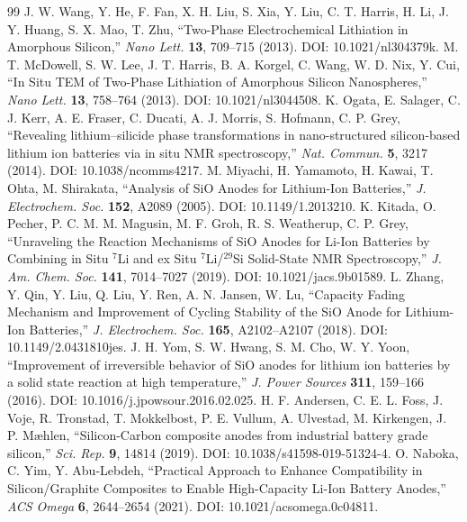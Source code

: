 \begin{thebibliography}{99}
 J. W. Wang, Y. He, F. Fan, X. H. Liu, S. Xia, Y. Liu, C. T. Harris, H. Li, J. Y. Huang, S. X. Mao, T. Zhu, ``Two-Phase Electrochemical Lithiation in Amorphous Silicon,'' \emph{Nano Lett.} \textbf{13}, 709--715 (2013). DOI: 10.1021/nl304379k.
 M. T. McDowell, S. W. Lee, J. T. Harris, B. A. Korgel, C. Wang, W. D. Nix, Y. Cui, ``In Situ TEM of Two-Phase Lithiation of Amorphous Silicon Nanospheres,'' \emph{Nano Lett.} \textbf{13}, 758--764 (2013). DOI: 10.1021/nl3044508.
 K. Ogata, E. Salager, C. J. Kerr, A. E. Fraser, C. Ducati, A. J. Morris, S. Hofmann, C. P. Grey, ``Revealing lithium–silicide phase transformations in nano-structured silicon-based lithium ion batteries via in situ NMR spectroscopy,'' \emph{Nat. Commun.} \textbf{5}, 3217 (2014). DOI: 10.1038/ncomms4217.
 M. Miyachi, H. Yamamoto, H. Kawai, T. Ohta, M. Shirakata, ``Analysis of SiO Anodes for Lithium-Ion Batteries,'' \emph{J. Electrochem. Soc.} \textbf{152}, A2089 (2005). DOI: 10.1149/1.2013210.
 K. Kitada, O. Pecher, P. C. M. M. Magusin, M. F. Groh, R. S. Weatherup, C. P. Grey, ``Unraveling the Reaction Mechanisms of SiO Anodes for Li-Ion Batteries by Combining in Situ $^{7}$Li and ex Situ $^{7}$Li/$^{29}$Si Solid-State NMR Spectroscopy,'' \emph{J. Am. Chem. Soc.} \textbf{141}, 7014--7027 (2019). DOI: 10.1021/jacs.9b01589.
 L. Zhang, Y. Qin, Y. Liu, Q. Liu, Y. Ren, A. N. Jansen, W. Lu, ``Capacity Fading Mechanism and Improvement of Cycling Stability of the SiO Anode for Lithium-Ion Batteries,'' \emph{J. Electrochem. Soc.} \textbf{165}, A2102--A2107 (2018). DOI: 10.1149/2.0431810jes.
 J. H. Yom, S. W. Hwang, S. M. Cho, W. Y. Yoon, ``Improvement of irreversible behavior of SiO anodes for lithium ion batteries by a solid state reaction at high temperature,'' \emph{J. Power Sources} \textbf{311}, 159--166 (2016). DOI: 10.1016/j.jpowsour.2016.02.025.
 H. F. Andersen, C. E. L. Foss, J. Voje, R. Tronstad, T. Mokkelbost, P. E. Vullum, A. Ulvestad, M. Kirkengen, J. P. Mæhlen, ``Silicon-Carbon composite anodes from industrial battery grade silicon,'' \emph{Sci. Rep.} \textbf{9}, 14814 (2019). DOI: 10.1038/s41598-019-51324-4.
 O. Naboka, C. Yim, Y. Abu-Lebdeh, ``Practical Approach to Enhance Compatibility in Silicon/Graphite Composites to Enable High-Capacity Li-Ion Battery Anodes,'' \emph{ACS Omega} \textbf{6}, 2644--2654 (2021). DOI: 10.1021/acsomega.0c04811.

\end{thebibliography}
